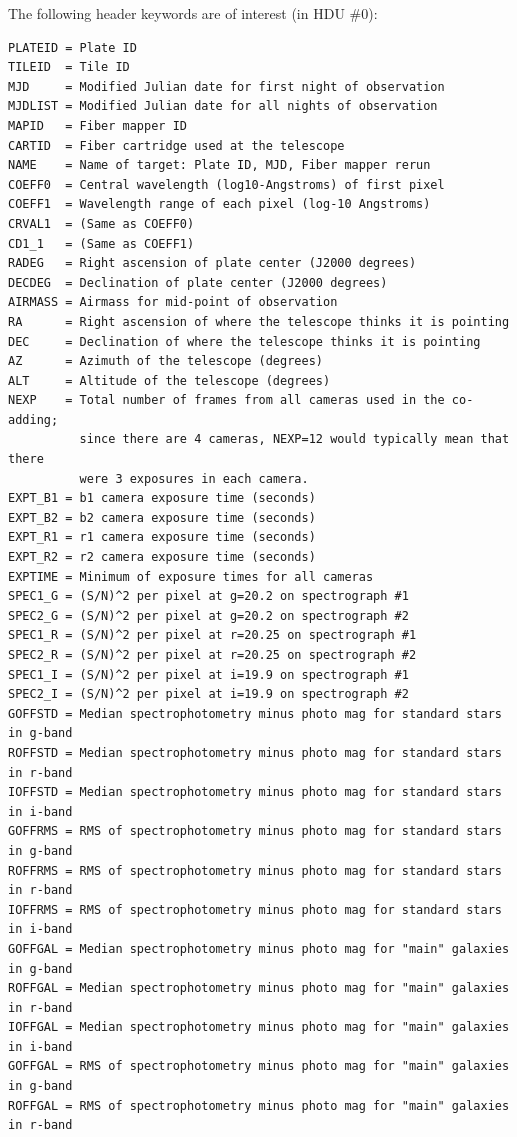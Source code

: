 \documentclass[12pt,preprint]{aastex}
\begin{document}
The following header keywords are of interest (in HDU \#0):
\begin{verbatim}
PLATEID = Plate ID
TILEID  = Tile ID
MJD     = Modified Julian date for first night of observation
MJDLIST = Modified Julian date for all nights of observation
MAPID   = Fiber mapper ID
CARTID  = Fiber cartridge used at the telescope
NAME    = Name of target: Plate ID, MJD, Fiber mapper rerun
COEFF0  = Central wavelength (log10-Angstroms) of first pixel
COEFF1  = Wavelength range of each pixel (log-10 Angstroms)
CRVAL1  = (Same as COEFF0)
CD1_1   = (Same as COEFF1)
RADEG   = Right ascension of plate center (J2000 degrees)
DECDEG  = Declination of plate center (J2000 degrees)
AIRMASS = Airmass for mid-point of observation
RA      = Right ascension of where the telescope thinks it is pointing
DEC     = Declination of where the telescope thinks it is pointing
AZ      = Azimuth of the telescope (degrees)
ALT     = Altitude of the telescope (degrees)
NEXP    = Total number of frames from all cameras used in the co-adding;
          since there are 4 cameras, NEXP=12 would typically mean that there
          were 3 exposures in each camera.
EXPT_B1 = b1 camera exposure time (seconds)
EXPT_B2 = b2 camera exposure time (seconds)
EXPT_R1 = r1 camera exposure time (seconds)
EXPT_R2 = r2 camera exposure time (seconds)
EXPTIME = Minimum of exposure times for all cameras
SPEC1_G = (S/N)^2 per pixel at g=20.2 on spectrograph #1
SPEC2_G = (S/N)^2 per pixel at g=20.2 on spectrograph #2
SPEC1_R = (S/N)^2 per pixel at r=20.25 on spectrograph #1
SPEC2_R = (S/N)^2 per pixel at r=20.25 on spectrograph #2
SPEC1_I = (S/N)^2 per pixel at i=19.9 on spectrograph #1
SPEC2_I = (S/N)^2 per pixel at i=19.9 on spectrograph #2
GOFFSTD = Median spectrophotometry minus photo mag for standard stars in g-band
ROFFSTD = Median spectrophotometry minus photo mag for standard stars in r-band
IOFFSTD = Median spectrophotometry minus photo mag for standard stars in i-band
GOFFRMS = RMS of spectrophotometry minus photo mag for standard stars in g-band
ROFFRMS = RMS of spectrophotometry minus photo mag for standard stars in r-band
IOFFRMS = RMS of spectrophotometry minus photo mag for standard stars in i-band
GOFFGAL = Median spectrophotometry minus photo mag for "main" galaxies in g-band
ROFFGAL = Median spectrophotometry minus photo mag for "main" galaxies in r-band
IOFFGAL = Median spectrophotometry minus photo mag for "main" galaxies in i-band
GOFFGAL = RMS of spectrophotometry minus photo mag for "main" galaxies in g-band
ROFFGAL = RMS of spectrophotometry minus photo mag for "main" galaxies in r-band

\end{verbatim}
\end{document}
